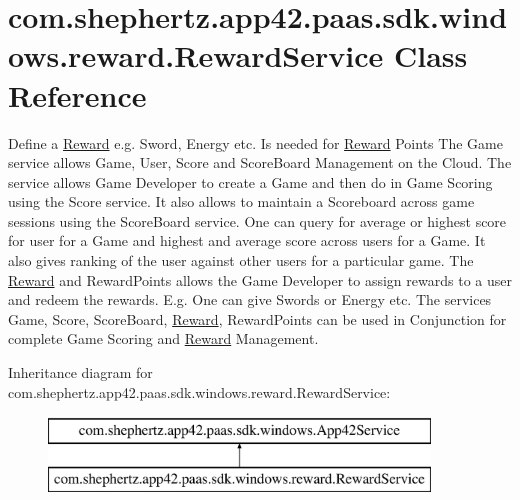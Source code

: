 \hypertarget{classcom_1_1shephertz_1_1app42_1_1paas_1_1sdk_1_1windows_1_1reward_1_1_reward_service}{\section{com.\+shephertz.\+app42.\+paas.\+sdk.\+windows.\+reward.\+Reward\+Service Class Reference}
\label{classcom_1_1shephertz_1_1app42_1_1paas_1_1sdk_1_1windows_1_1reward_1_1_reward_service}
}


Define a \hyperlink{classcom_1_1shephertz_1_1app42_1_1paas_1_1sdk_1_1windows_1_1reward_1_1_reward}{Reward} e.\+g. Sword, Energy etc. Is needed for \hyperlink{classcom_1_1shephertz_1_1app42_1_1paas_1_1sdk_1_1windows_1_1reward_1_1_reward}{Reward} Points The Game service allows Game, User, Score and Score\+Board Management on the Cloud. The service allows Game Developer to create a Game and then do in Game Scoring using the Score service. It also allows to maintain a Scoreboard across game sessions using the Score\+Board service. One can query for average or highest score for user for a Game and highest and average score across users for a Game. It also gives ranking of the user against other users for a particular game. The \hyperlink{classcom_1_1shephertz_1_1app42_1_1paas_1_1sdk_1_1windows_1_1reward_1_1_reward}{Reward} and Reward\+Points allows the Game Developer to assign rewards to a user and redeem the rewards. E.\+g. One can give Swords or Energy etc. The services Game, Score, Score\+Board, \hyperlink{classcom_1_1shephertz_1_1app42_1_1paas_1_1sdk_1_1windows_1_1reward_1_1_reward}{Reward}, Reward\+Points can be used in Conjunction for complete Game Scoring and \hyperlink{classcom_1_1shephertz_1_1app42_1_1paas_1_1sdk_1_1windows_1_1reward_1_1_reward}{Reward} Management.  


Inheritance diagram for com.\+shephertz.\+app42.\+paas.\+sdk.\+windows.\+reward.\+Reward\+Service\+:\begin{figure}[H]
\begin{center}
\leavevmode
\includegraphics[height=2.000000cm]{classcom_1_1shephertz_1_1app42_1_1paas_1_1sdk_1_1windows_1_1reward_1_1_reward_service}
\end{center}
\end{figure}
